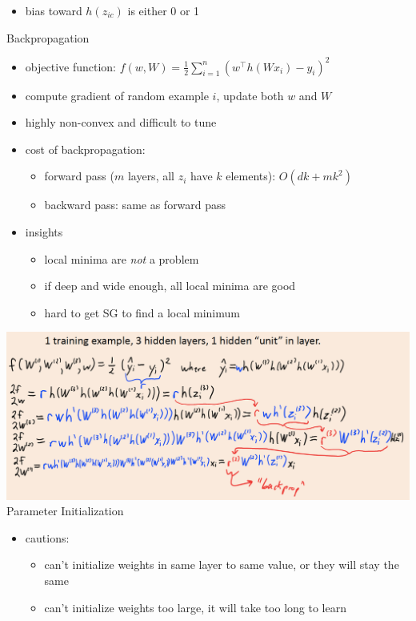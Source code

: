 \documentclass[10pt,landscape,a4paper]{article}
\begin{document}
\begin{multicols*}{5}
\begin{itemize}
    \item bias toward \(h(z_{ic})\) is either 0 or 1
\end{itemize}
Backpropagation
\begin{itemize}
    \item objective function: \(f(w,W) = \frac{1}{2} \sum\limits_{i=1}^{n} (w^\intercal h(W x_i) - y_i)^2\)
    \item compute gradient of random example \(i\), update both \(w\) and \(W\)
    \item highly non-convex and difficult to tune
    \item cost of backpropagation:
    \begin{itemize}
        \item forward pass (\(m\) layers, all \(z_i\) have \(k\) elements): \(O(dk + mk^2)\)
        \item backward pass: same as forward pass
    \end{itemize}
    \item insights
    \begin{itemize}
        \item local minima are \emph{not} a problem
        \item if deep and wide enough, all local minima are good
        \item hard to get SG to find a local minimum
    \end{itemize}
\end{itemize}
\includegraphics[scale=0.12]{backpropagation} \\
Parameter Initialization
\begin{itemize}
    \item cautions:
    \begin{itemize}
        \item can't initialize weights in same layer to same value, or they will stay the same
        \item can't initialize weights too large, it will take too long to learn

\end{itemize}
\end{itemize}
\end{multicols*}
\end{document}
